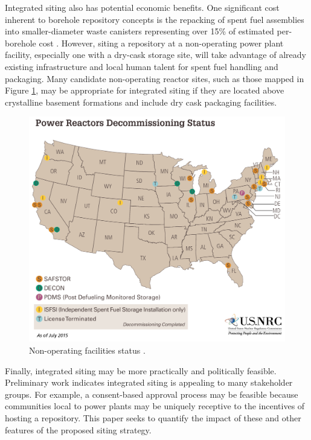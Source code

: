 Integrated siting also has potential economic benefits. One significant cost 
inherent to borehole repository concepts is the repacking of spent fuel 
assemblies into smaller-diameter waste canisters representing over 15\% of 
estimated per-borehole cost \cite{arnold_reference_2011}.  However, siting a 
repository at a non-operating power plant facility, especially one with a 
dry-cask storage site, will take advantage of already existing infrastructure 
and local human talent for spent fuel handling and packaging. Many candidate 
non-operating reactor sites, such as those mapped in Figure \ref{fig:shutdown}, 
may be appropriate for integrated siting if they are located above crystalline 
basement formations and include dry cask packaging facilities.

\begin{figure}[htpb!] 
  \centering
  \includegraphics[width=0.8\columnwidth]{power-reactors-decommissioning}	
  \caption{Non-operating facilities status
  \cite{nuclear_regulatory_commission_nrc_2015}.}
  \label{fig:shutdown}
\end{figure}

Finally, integrated siting may be more practically and politically feasible. 
Preliminary work \cite{waleed_regional_2015} indicates integrated siting is 
appealing to many stakeholder groups. For example, a consent-based approval 
process may be feasible because communities local to power plants may be 
uniquely receptive to the incentives of hosting a repository. This paper seeks to
 quantify the impact of these and other features of the proposed siting strategy. 



